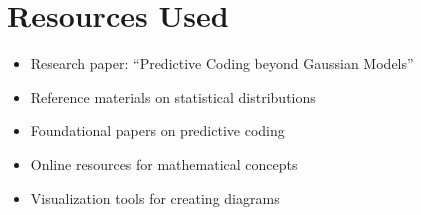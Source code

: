 \documentclass{article}
\begin{document}
\section{Resources Used}

\begin{itemize}
  \item Research paper: ``Predictive Coding beyond Gaussian Models''
  \item Reference materials on statistical distributions
  \item Foundational papers on predictive coding
  \item Online resources for mathematical concepts
  \item Visualization tools for creating diagrams
\end{itemize}
\end{document}
